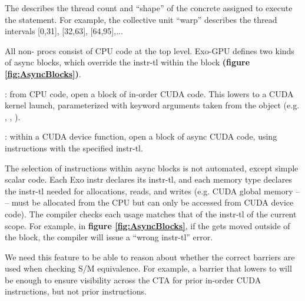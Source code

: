 \filbreak
The  describes the thread count and ``shape'' of the concrete  assigned to execute the statement.
For example, the collective unit ``warp'' describes the thread intervals [0,31], [32,63], [64,95],...

\filbreak
{}


\begin{figure*}[!b]

\caption{Example async blocks, with sm\_80 cp.async instructions used}
\label{fig:AsyncBlocks}
\end{figure*}

All non- procs consist of CPU code at the top level.
Exo-GPU defines two kinds of async blocks, which override the instr-tl within the block \textbf{(figure \ref{fig:AsyncBlocks})}.

\filbreak
{}: from CPU code, open a block of in-order CUDA code.
This lowers to a CUDA kernel launch, parameterized with keyword arguments taken from the  object (e.g. , , ).

\filbreak
{}: within a CUDA device function, open a block of async CUDA code, using instructions with the specified instr-tl.

\filbreak
The selection of instructions within async blocks is not automated, except simple scalar code.
Each Exo instr declares its instr-tl, and each memory type declares the instr-tl needed for allocations, reads, and writes (e.g. CUDA global memory --  -- must be allocated from the CPU but can only be accessed from CUDA device code).
The compiler checks each usage matches that of the instr-tl of the current scope.
For example, in \textbf{figure \ref{fig:AsyncBlocks}}, if the  gets moved outside of the  block, the compiler will issue a ``wrong instr-tl'' error.

 We need this feature to be able to reason about whether the correct barriers are used when checking S/M equivalence. For example, a barrier that lowers to  will be enough to ensure visibility across the CTA for prior in-order CUDA instructions, but not prior  instructions.

